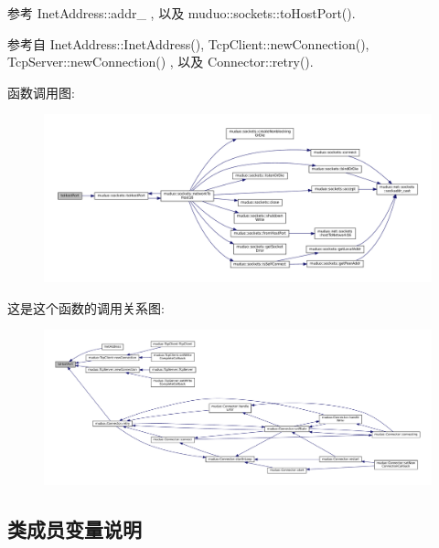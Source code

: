 参考 Inet\+Address\+::addr\+\_\+ , 以及 muduo\+::sockets\+::to\+Host\+Port().



参考自 Inet\+Address\+::\+Inet\+Address(), Tcp\+Client\+::new\+Connection(), Tcp\+Server\+::new\+Connection() , 以及 Connector\+::retry().

函数调用图\+:
\nopagebreak
\begin{figure}[H]
\begin{center}
\leavevmode
\includegraphics[width=350pt]{classmuduo_1_1InetAddress_afe6339cb39e2b7972bccd0f1418a062c_cgraph}
\end{center}
\end{figure}
这是这个函数的调用关系图\+:
\nopagebreak
\begin{figure}[H]
\begin{center}
\leavevmode
\includegraphics[width=350pt]{classmuduo_1_1InetAddress_afe6339cb39e2b7972bccd0f1418a062c_icgraph}
\end{center}
\end{figure}


\subsection{类成员变量说明}
\mbox{\label{classmuduo_1_1InetAddress_a6d6d32117d52a72865bf26dc7e0bc646}} 
